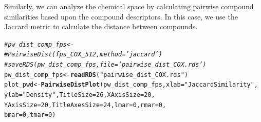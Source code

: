 \documentclass[twoside,a4wide,12pt]{article}\usepackage[]{graphicx}\usepackage[]{color}
\makeatletter
\newcommand{\hlnum}[1]{\textcolor[rgb]{0.686,0.059,0.569}{#1}}%
\newcommand{\hlstr}[1]{\textcolor[rgb]{0.192,0.494,0.8}{#1}}%
\newcommand{\hlcom}[1]{\textcolor[rgb]{0.678,0.584,0.686}{\textit{#1}}}%
\newcommand{\hlstd}[1]{\textcolor[rgb]{0.345,0.345,0.345}{#1}}%
\newcommand{\hlkwb}[1]{\textcolor[rgb]{0.69,0.353,0.396}{#1}}%
\newcommand{\hlkwc}[1]{\textcolor[rgb]{0.333,0.667,0.333}{#1}}%
\newcommand{\hlkwd}[1]{\textcolor[rgb]{0.737,0.353,0.396}{\textbf{#1}}}%
\newenvironment{kframe}{%
 \def\at@end@of@kframe{}%
 \ifinner\ifhmode%
  \def\at@end@of@kframe{\end{minipage}}%
  \begin{minipage}{\columnwidth}%
 \fi\fi%
 \def\FrameCommand##1{\hskip\@totalleftmargin \hskip-\fboxsep
 \colorbox{shadecolor}{##1}\hskip-\fboxsep
     \hskip-\linewidth \hskip-\@totalleftmargin \hskip\columnwidth}%
 \MakeFramed {\advance\hsize-\width
   \@totalleftmargin\z@ \linewidth\hsize
   \@setminipage}}%
 {\par\unskip\endMakeFramed%
 \at@end@of@kframe}
\newenvironment{knitrout}{}{} %
\makeatother
\begin{document}
Similarly, we can analyze the chemical space by calculating pairwise compound similarities based upon the compound descriptors. In this case, we use the Jaccard metric to calculate the distance between compounds.
\begin{knitrout}
\color{fgcolor}\begin{kframe}
\begin{alltt}
\hlcom{# pw_dist_comp_fps <-}
\hlcom{# PairwiseDist(fps_COX_512,method='jaccard')}
\hlcom{# saveRDS(pw_dist_comp_fps,file='pairwise_dist_COX.rds')}
\hlstd{pw_dist_comp_fps} \hlkwb{<-} \hlkwd{readRDS}\hlstd{(}\hlstr{"pairwise_dist_COX.rds"}\hlstd{)}
\hlstd{plot_pwd} \hlkwb{<-} \hlkwd{PairwiseDistPlot}\hlstd{(pw_dist_comp_fps,} \hlkwc{xlab} \hlstd{=} \hlstr{"Jaccard Similarity"}\hlstd{,}
    \hlkwc{ylab} \hlstd{=} \hlstr{"Density"}\hlstd{,} \hlkwc{TitleSize} \hlstd{=} \hlnum{26}\hlstd{,} \hlkwc{XAxisSize} \hlstd{=} \hlnum{20}\hlstd{,}
    \hlkwc{YAxisSize} \hlstd{=} \hlnum{20}\hlstd{,} \hlkwc{TitleAxesSize} \hlstd{=} \hlnum{24}\hlstd{,} \hlkwc{lmar} \hlstd{=} \hlnum{0}\hlstd{,} \hlkwc{rmar} \hlstd{=} \hlnum{0}\hlstd{,}
    \hlkwc{bmar} \hlstd{=} \hlnum{0}\hlstd{,} \hlkwc{tmar} \hlstd{=} \hlnum{0}\hlstd{)}
\end{alltt}
\end{kframe}
\end{knitrout}
\end{document}
